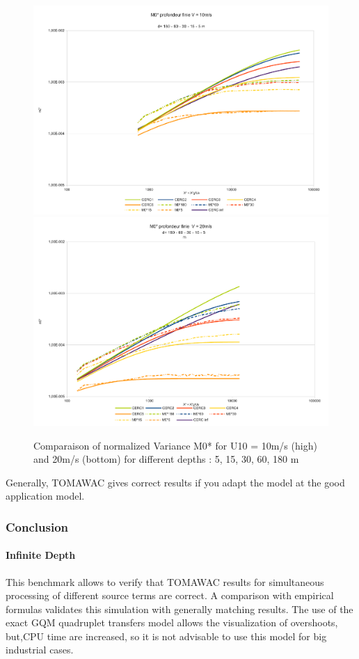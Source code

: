 \begin{figure}
\centering
\includegraphics[scale=0.4]{m0_test7v10.pdf}\\
\includegraphics[scale=0.4]{m0_test7v20.pdf}\\
\caption{Comparaison of normalized Variance M0* for U10 = 10m/s (high) and 20m/s (bottom) for different depths : 5, 15, 30, 60, 180 m}
\end{figure}
Generally, TOMAWAC gives correct results if you adapt the model at the good application model. 
\subsubsection{Conclusion}
\paragraph*{Infinite Depth}
This benchmark allows to verify that TOMAWAC results for simultaneous processing of different source terms are correct. A comparison with empirical formulas validates this simulation with generally matching results. The use of the exact GQM quadruplet transfers model allows the visualization of overshoots, but,CPU time are increased, so it is not advisable to use this model for big industrial cases.
